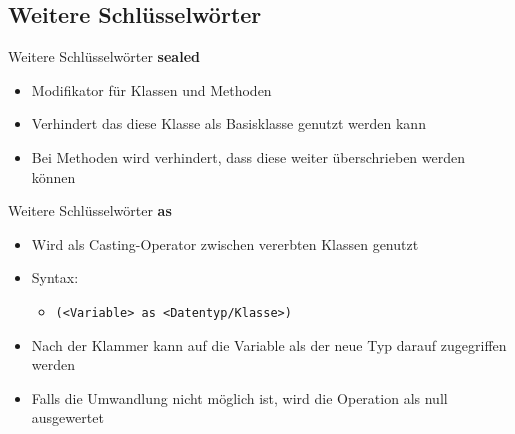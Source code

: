 \subsection{Weitere Schlüsselwörter}
\begin{frame}{Weitere Schlüsselwörter}
	\textbf{sealed}\\
	\begin{itemize}
		\item Modifikator für Klassen und Methoden
		\item Verhindert das diese Klasse als Basisklasse genutzt werden kann
		\item Bei Methoden wird verhindert, dass diese weiter überschrieben werden können
	\end{itemize}
	
\end{frame}

\begin{frame}{Weitere Schlüsselwörter}
	\textbf{as}\\
	\begin{itemize}
		\item Wird als Casting-Operator zwischen vererbten Klassen genutzt
		\item Syntax:
		\begin{itemize}
			\item \texttt{(\alert{<Variable>} as \alert{<Datentyp/Klasse>})}
		\end{itemize}
		\item Nach der Klammer kann auf die Variable als der neue Typ darauf zugegriffen werden
		\item Falls die Umwandlung nicht möglich ist, wird die Operation als \alert{null} ausgewertet
	\end{itemize}	
	
\end{frame}

